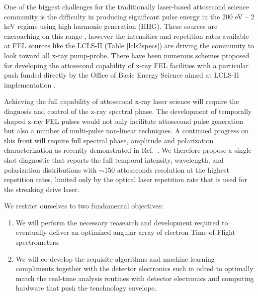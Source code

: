 One of the biggest challenges for the traditionally laser-based attosecond science community is the difficulty in producing significant pulse energy in the 200 eV -- 2 keV regime using high harmonic generation (HHG)\cite{Chen2014,Schmidt2016}.
These sources are encroaching on this range \cite{Biegert2014,Zenghu2017}, however the intensities and repetition rates available at FEL sources like the LCLS-II (Table \ref{lcls2specs}) are driving the community to look toward all x-ray pump-probe. 
There have been numerous schemes proposed for developing the attosecond capability of x-ray FEL facilities \cite{Ding2009,Xiang2009} with a particular push funded directly by the Office of Basic Energy Science aimed at LCLS-II implementation \cite{Marinelli2016,xLEAP}.


Achieving the full capability of attosecond x-ray laser science will require the diagnosis and control of the x-ray spectral phase.
The development of temporally shaped x-ray FEL pulses would not only facilitate attosecond pulse generation but also a number of multi-pulse non-linear techniques.
A continued progress on this front \cite{Lutman13_twocolor,Marinelli13_twocolor,Allaria2014,Marinelli2015,Prince2016,Lutman2016,Marinelli2016} will require full spectral phase, amplitude and polarization characterization as recently demonstrated in Ref.~\cite{Nick2018}.
We therefore propose a single-shot diagnostic that reports the full temporal intensity, wavelength, and polarization distributions with $\sim$150 attoseconds resolution at the highest repetition rates, limited only by the optical laser repetition rate that is used for the streaking drive laser.

We restrict ourselves to two fundamental objectives:
\begin{enumerate}
\item \label{obj::detector} We will perform the necessary reasearch and development required to eventually deliver an optimized angular array of electron Time-of-Flight spectrometers.
\item \label{obj::analysis} We will co-develop the requisite algorithms and machine learning compliments together with the detector electronics such in odred to optimally match the real-time analysis routines with detector electronics and computing hardware that push the tenchnology envelope.
\end{enumerate}


